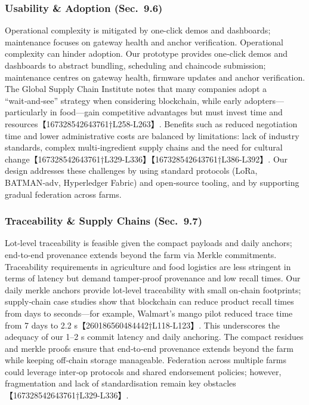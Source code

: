\subsubsection{Usability \& Adoption (Sec.~9.6)}
Operational complexity is mitigated by one-click demos and dashboards; maintenance focuses on gateway health and anchor verification. Operational complexity can hinder adoption.  Our prototype provides one‑click demos and dashboards to abstract bundling, scheduling and chaincode submission; maintenance centres on gateway health, firmware updates and anchor verification.  The Global Supply Chain Institute notes that many companies adopt a ``wait‑and‑see'' strategy when considering blockchain, while early adopters—particularly in food—gain competitive advantages but must invest time and resources【167328542643761†L258-L263】.  Benefits such as reduced negotiation time and lower administrative costs are balanced by limitations: lack of industry standards, complex multi‑ingredient supply chains and the need for cultural change【167328542643761†L329-L336】【167328542643761†L386-L392】.  Our design addresses these challenges by using standard protocols (LoRa, BATMAN‑adv, Hyperledger Fabric) and open‑source tooling, and by supporting gradual federation across farms.

\subsubsection{Traceability \& Supply Chains (Sec.~9.7)}
Lot-level traceability is feasible given the compact payloads and daily anchors; end-to-end provenance extends beyond the farm via Merkle commitments. Traceability requirements in agriculture and food logistics are less stringent in terms of latency but demand tamper‑proof provenance and low recall times.  Our daily merkle anchors provide lot‑level traceability with small on‑chain footprints; supply‑chain case studies show that blockchain can reduce product recall times from days to seconds—for example, Walmart’s mango pilot reduced trace time from 7 days to 2.2 s【260186560484442†L118-L123】.  This underscores the adequacy of our 1–2 s commit latency and daily anchoring.  The compact residues and merkle proofs ensure that end‑to‑end provenance extends beyond the farm while keeping off‑chain storage manageable.  Federation across multiple farms could leverage inter‑op protocols and shared endorsement policies; however, fragmentation and lack of standardisation remain key obstacles【167328542643761†L329-L336】.

